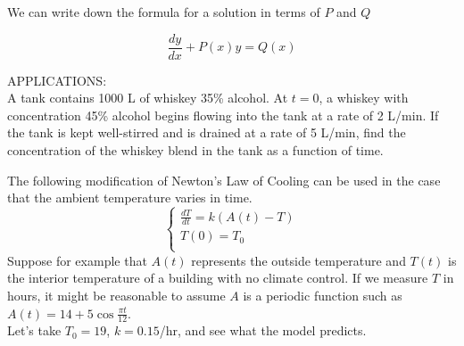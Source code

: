 \documentclass[11pt]{article}
\begin{document}
\vspace{3.5in}

We can write down the formula for a solution in terms of $P$ and $Q$

\begin{displaymath}
  \frac{dy}{dx} + P(x)y = Q(x)
\end{displaymath}


\vspace{2.5in}

\pagebreak


APPLICATIONS:\\

A tank contains 1000 L of whiskey 35\% alcohol.   At $t=0$, a whiskey with concentration 45\% alcohol begins
flowing into the tank at a rate of 2 L/min. If the tank is kept well-stirred and is drained at a rate of 5 L/min,
find the concentration of the whiskey blend in the tank as a function of time.

\pagebreak

The following modification of Newton's Law of Cooling can be used in the case that the ambient temperature varies in time.
    \begin{displaymath}
  \left\{ \begin{array}{ll}
\frac{dT}{dt} = k(A(t) - T)\\
T(0) = T_0 \\
\end{array} \right.
  \end{displaymath}
    Suppose for example that $A(t)$ represents the outside temperature and $T(t)$ is the interior temperature of a building with no climate control.  If we
    measure $T$ in hours, it might be reasonable to assume $A$ is a periodic function such as $A(t) = 14 + 5\cos{\frac{\pi t}{12}}$.\\

    Let's take $T_0 = 19$, $k=0.15$/hr, and see what the model predicts.
\end{document}
